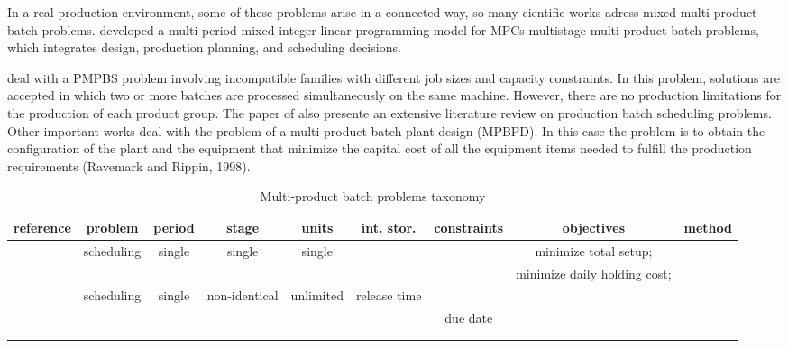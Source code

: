 \documentclass[authoryear,manuscript,12pt]{elsarticle}
\begin{document}
In a real production environment, some of these problems arise in a connected way, so many cientific works adress mixed multi-product batch problems. \cite{FumeroEtAl2016} developed a multi-period mixed-integer linear programming model for MPCs multistage multi-product batch problems, which integrates design, production planning, and scheduling decisions. 

\cite{LiEtAl2022} deal with a PMPBS problem involving incompatible families with different job sizes and capacity constraints. In this problem, solutions are accepted in which two or more batches are processed simultaneously on the same machine. However, there are no production limitations for the production of each product group. The paper of \cite{LiEtAl2022} also presente an extensive literature review on production batch scheduling problems. Other important works deal with the problem of a multi-product batch plant design (MPBPD). In this case the problem is to obtain the configuration of the plant and the equipment that minimize the capital cost of all the equipment items needed to fulfill the production requirements (Ravemark and Rippin, 1998).

\begin{sidewaystable}[h]
\begin{center}
\begin{small}
\begin{tabular}[c]{|c|c|c|c|c|c|c|c|c|}
reference & problem & period & stage & units & int. stor. & constraints & objectives & method \\
\hline
\multirow{2}{*}{\cite{Eilon1985}} & \multirow{2}{*}{scheduling} & \multirow{2}{*}{single} & \multirow{2}{*}{single} & \multirow{2}{*}{single} & & & minimize total setup;  \\
 & & & & & & & minimize daily holding cost;  \\
\multirow{3}{*}{\cite{ShiEtAll2017}} & \multirow{3}{*}{scheduling} & \multirow{3}{*}{single} & non-identical & \multirow{3}{*}{unlimited} & release time \\
 & & & & parallel & & due date \\
 & & & & & \\
 & & & & \\
\end{tabular}
\label{tab:MBPTax}
\caption{Multi-product batch problems taxonomy}
\end{small}
\end{center}
\end{sidewaystable}
\end{document}
